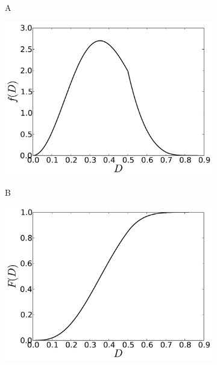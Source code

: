 \begin{figure}[ht]
\centering
\begin{subfigure}[b]{0.49\textwidth}
	  \begin{flushleft}
	  \large A
		\end{flushleft}
    \centering
    \includegraphics[width=\textwidth]{Gaussian3D_PDF.pdf}
    \label{subfig:gaussian3D_PDF}
\end{subfigure}
\begin{subfigure}[b]{0.49\textwidth}
	  \begin{flushleft}
	  \large B
		\end{flushleft}
    \centering
    \includegraphics[width=\textwidth]{Gaussian3D_CDF.pdf}
    \label{subfig:gaussian3D_CDF}

\end{subfigure}
\end{figure}

